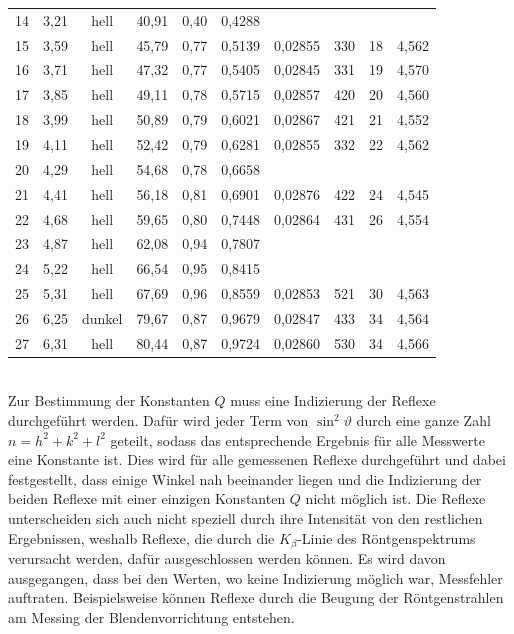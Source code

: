 \documentclass[a4paper,twoside,final]{article}
\begin{document}
\begin{table}[ht]
\begin{tabular}{l c c c c c | c c c c}
14 & 3,21 & hell      & 40,91 & 0,40 & 0,4288 &         &     &    &       \\
15 & 3,59 & hell      & 45,79 & 0,77 & 0,5139 & 0,02855 & 330 & 18 & 4,562 \\
16 & 3,71 & hell      & 47,32 & 0,77 & 0,5405 & 0,02845 & 331 & 19 & 4,570 \\
17 & 3,85 & hell      & 49,11 & 0,78 & 0,5715 & 0,02857 & 420 & 20 & 4,560 \\
18 & 3,99 & hell      & 50,89 & 0,79 & 0,6021 & 0,02867 & 421 & 21 & 4,552 \\
19 & 4,11 & hell      & 52,42 & 0,79 & 0,6281 & 0,02855 & 332 & 22 & 4,562 \\
20 & 4,29 & hell      & 54,68 & 0,78 & 0,6658 &         &     &    &       \\
21 & 4,41 & hell      & 56,18 & 0,81 & 0,6901 & 0,02876 & 422 & 24 & 4,545 \\
22 & 4,68 & hell      & 59,65 & 0,80 & 0,7448 & 0,02864 & 431 & 26 & 4,554 \\
23 & 4,87 & hell      & 62,08 & 0,94 & 0,7807 &         &     &    &       \\
24 & 5,22 & hell      & 66,54 & 0,95 & 0,8415 &         &     &    &       \\
25 & 5,31 & hell      & 67,69 & 0,96 & 0,8559 & 0,02853 & 521 & 30 & 4,563 \\
26 & 6,25 & dunkel    & 79,67 & 0,87 & 0,9679 & 0,02847 & 433 & 34 & 4,564 \\
27 & 6,31 & hell      & 80,44 & 0,87 & 0,9724 & 0,02860 & 530 & 34 & 4,566
	\end{tabular}
\end{table}\\
Zur Bestimmung der Konstanten $Q$ muss eine Indizierung der Reflexe durchgeführt werden. Dafür wird jeder Term von $\sin^2 \vartheta $ durch eine ganze Zahl $n = h^2 + k^2 + l^2$ geteilt, sodass das entsprechende Ergebnis für alle Messwerte eine Konstante ist. Dies wird für alle gemessenen Reflexe durchgeführt und dabei festgestellt, dass einige Winkel nah beeinander liegen und die Indizierung der beiden Reflexe mit einer einzigen Konstanten $Q$ nicht möglich ist. Die Reflexe unterscheiden sich auch nicht speziell durch ihre Intensität von den restlichen Ergebnissen, weshalb Reflexe, die durch die $K_\beta$-Linie des Röntgenspektrums verursacht werden, dafür ausgeschlossen werden können. Es wird davon ausgegangen, dass bei den Werten, wo keine Indizierung möglich war, Messfehler auftraten. Beispielsweise können Reflexe durch die Beugung der Röntgenstrahlen am Messing der Blendenvorrichtung entstehen.
\end{document}
